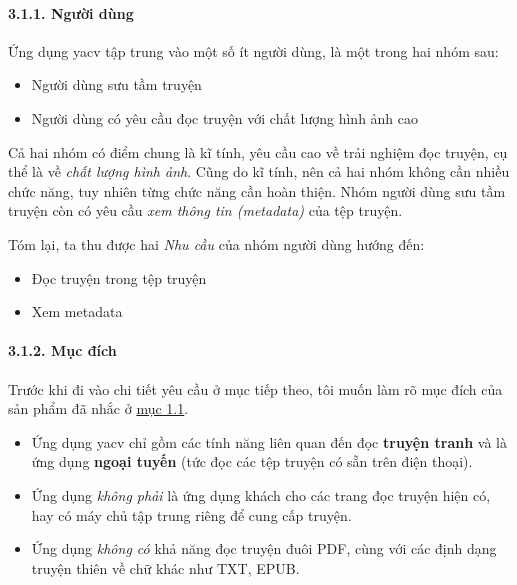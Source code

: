 \documentclass[
]{article}
\begin{document}
\hypertarget{ngux1b0ux1eddi-duxf9ng}{%
\paragraph{\texorpdfstring{3.1.1. Người dùng
}{3.1.1. Người dùng }}\label{ngux1b0ux1eddi-duxf9ng}}

Ứng dụng yacv tập trung vào một số ít người dùng, là một trong hai nhóm
sau:

\begin{itemize}
\item
  Người dùng sưu tầm truyện
\item
  Người dùng có yêu cầu đọc truyện với chất lượng hình ảnh cao
\end{itemize}

Cả hai nhóm có điểm chung là kĩ tính, yêu cầu cao về trải nghiệm đọc
truyện, cụ thể là về \emph{chất lượng hình ảnh}. Cũng do kĩ tính, nên cả
hai nhóm không cần nhiều chức năng, tuy nhiên từng chức năng cần hoàn
thiện. Nhóm người dùng sưu tầm truyện còn có yêu cầu \emph{xem thông tin
(metadata)} của tệp truyện.

Tóm lại, ta thu được hai \emph{Nhu cầu} của nhóm người dùng hướng đến:

\begin{itemize}
\item
  Đọc truyện trong tệp truyện
\item
  Xem metadata
\end{itemize}

\hypertarget{mux1ee5c-ux111uxedch}{%
\paragraph{\texorpdfstring{3.1.2. Mục đích
}{3.1.2. Mục đích }}\label{mux1ee5c-ux111uxedch}}

Trước khi đi vào chi tiết yêu cầu ở mục tiếp theo, tôi muốn làm rõ mục
đích của sản phẩm đã nhắc ở \protect\hyperlink{P1.1-background}{mục
1.1}.

\begin{itemize}
\item
  Ứng dụng yacv chỉ gồm các tính năng liên quan đến đọc \textbf{truyện
  tranh} và là ứng dụng \textbf{ngoại tuyến} (tức đọc các tệp truyện có
  sẵn trên điện thoại).
\item
  Ứng dụng \emph{không phải} là ứng dụng khách cho các trang đọc truyện
  hiện có, hay có máy chủ tập trung riêng để cung cấp truyện.
\item
  Ứng dụng \emph{không có} khả năng đọc truyện đuôi PDF, cùng với các
  định dạng truyện thiên về chữ khác như TXT, EPUB.
\end{itemize}
\end{document}
